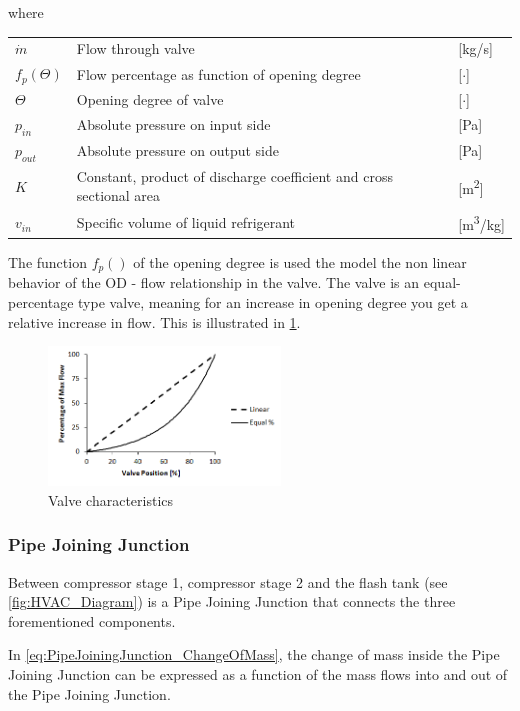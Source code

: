 where
\begin{center}
	\begin{tabular}{l p{8cm} l}
		$\dot{m}$	& Flow through valve & [\si{kg}/\si{s}]\\
		$f_p(\Theta)$ & Flow percentage as function of opening degree & [$\cdot$] \\
		$ \Theta $ & Opening degree of valve& [$ \cdot $]\\
		$p_{in}$ 	& Absolute pressure on input side & [\si{Pa}]\\
		$p_{out}$ 	& Absolute pressure on output side & [\si{Pa}]\\
		$K$ 		& Constant, product of discharge coefficient and cross sectional area & [\si{m^2}]\\
		$v_{in}$ 	& Specific volume of liquid refrigerant & [\si{m^3}/\si{kg}]

	\end{tabular}
\end{center}

The function $f_p()$ of the opening degree is used the model the non linear behavior of the OD - flow relationship in the valve. The valve is an equal-percentage type valve, meaning for an increase in opening degree you get a relative increase in flow. This is illustrated in \cref{fig:equal_percent_valve}.

\begin{figure}[h!]
	\centering
	\includegraphics[width=0.55\textwidth]{Graphics/Equal-percentage.png}
	\caption{Valve characteristics}
	\label{fig:equal_percent_valve}
\end{figure}


\subsubsection{Pipe Joining Junction}
Between compressor stage 1, compressor stage 2 and the flash tank (see \cref{fig:HVAC_Diagram}) is a Pipe Joining Junction that connects the three forementioned components.

In \cref{eq:PipeJoiningJunction_ChangeOfMass}, the change of mass inside the Pipe Joining Junction can be expressed as a function of the mass flows into and out of the Pipe Joining Junction.

